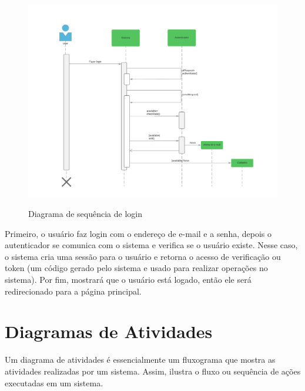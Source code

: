 \begin{figure}[H]
      \begin{center}
            \caption{Diagrama de sequência de login} \label{afp}
            \includegraphics[width=15cm]{Pictures/diagram/sequencia.png} \\


      \end{center}
\end{figure}
Primeiro, o usuário faz login com o endereço de e-mail e a senha, depois o autenticador se comunica com o sistema e verifica se o usuário existe. Nesse caso, o sistema cria uma sessão para o usuário e retorna o acesso de verificação ou token (um código gerado pelo sistema e usado para realizar operações no sistema). Por fim, mostrará que o usuário está logado, então ele será redirecionado para a página principal.
\section{Diagramas de Atividades}
Um diagrama de atividades é essencialmente um fluxograma que mostra as atividades realizadas por um sistema. Assim, ilustra o fluxo ou sequência de ações executadas em um sistema.

